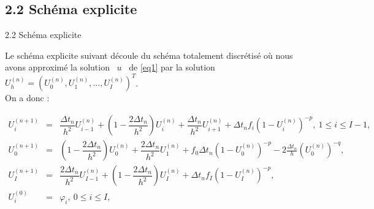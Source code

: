 \documentclass[10pt]{beamer}
\begin{document}
\begin{frame}
\subsection{2.2 Schéma explicite}
\begin{block}{2.2 Schéma explicite}\end{block}
Le schéma explicite suivant découle du schéma totalement discrétisé où nous avons approximé la solution \ $u$ \ de \eqref{eq1} par la solution $U_h^{(n)}=\left(U^{(n)}_0,U^{(n)}_1,...,U^{(n)}_I\right)^T$.\\  

   On a donc :
    \begin{block}
    
    \begin{eqnarray*}
	U^{(n+1)}_{i}&=&\dfrac{\Delta t_{n}}{h^{2}}U^{(n)}_{i-1}+\left(1-\dfrac{2\Delta t_{n}}{h^{2}}\right)U^{(n)}_{i}+\dfrac{\Delta t_{n}}{h^{2}}U^{(n)}_{i+1}+\Delta t_{n} f_{i}\left(1-U^{(n)}_{i}\right)^{-p},\ 1\leqslant i\leqslant I-1, \label{cha2equ5} \\
	U^{(n+1)}_{0}&=&\left(1-\dfrac{2\Delta t_{n}}{h^{2}}\right)U^{(n)}_{0}+\dfrac{2\Delta t_{n}}{h^{2}}U^{(n)}_{1}+f_{0}\Delta t_{n}\left(1-U^{(n)}_{0}\right)^{-p}-2\frac{\Delta t_{n}}{h}\left(U^{(n)}_{0}\right)^{-q}, \label{cha2equ6}\\
	U^{(n+1)}_{I}&=&\dfrac{2\Delta t_{n}}{h^{2}}U^{(n)}_{I-1}+\left(1-\dfrac{2\Delta t_{n}}{h^{2}}\right)U^{(n)}_{I}+\Delta t_{n}f_{I}\left(1-U^{(n)}_{I}\right)^{-p},\label{cha2equ7} \\
	U_i^{(0)}&=&\varphi_i,\ 0\leqslant i\leqslant I,\label{cha2equ8}
\end{eqnarray*}  
     
     \end{block}
   
       \end{frame}
\end{document}
